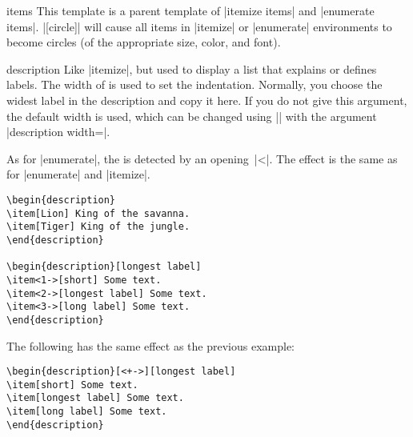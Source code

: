 \begin{element}{items}\semiyes\no\no
  This template is a parent template of |itemize items| and
  |enumerate items|.
  \example |[circle]| will cause all items in
  |itemize| or |enumerate| environments to become circles (of the
  appropriate size, color, and font).
\end{element}


\label{section-descriptions}
  
\begin{environment}{{description}} 
  Like |itemize|, but used to display a list that explains or defines
  labels. The width of  is used to set the
  indentation. Normally, you choose the widest label in the
  description and copy it here. If you do not give this argument, the
  default width is used, which can be changed using |\setbeamersize|
  with the argument |description width=|.

  As for |enumerate|, the  is
  detected by an opening~|<|. The effect is the same as for
  |enumerate| and |itemize|.
  \example
\begin{verbatim}
\begin{description}
\item[Lion] King of the savanna.
\item[Tiger] King of the jungle.
\end{description}

\begin{description}[longest label]
\item<1->[short] Some text.
\item<2->[longest label] Some text.
\item<3->[long label] Some text.
\end{description}
\end{verbatim}

  \example The following has the same effect as the previous example:
\begin{verbatim}
\begin{description}[<+->][longest label]
\item[short] Some text.
\item[longest label] Some text.
\item[long label] Some text.
\end{description}
\end{verbatim}


\end{environment}
